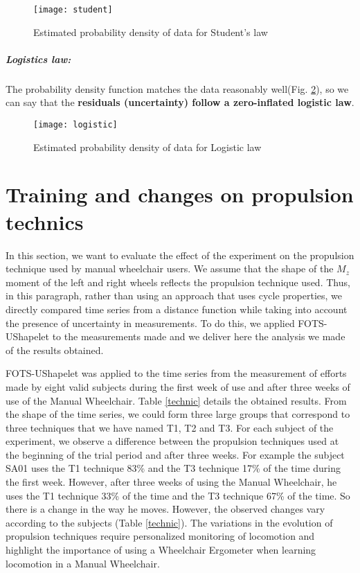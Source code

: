 \begin{figure}[h]
\centering
\texttt{[image: student]}
\caption{Estimated probability density of data for Student's law}
\label{student}
\end{figure}

\paragraph{Logistics law:} The probability density function matches the data reasonably well(Fig. \ref{logistic}), so we can say that the \textbf{residuals (uncertainty) follow a zero-inflated logistic law}.

\begin{figure}[h]
\centering
\texttt{[image: logistic]}
\caption{Estimated probability density of data for Logistic law}
\label{logistic}
\end{figure}









\chapter{Training and changes on propulsion technics}
\label{training_technic}
In this section, we want to evaluate the effect of the experiment on the propulsion technique used by manual wheelchair users. We assume that the shape of the $M_z$ moment of the left and right wheels reflects the propulsion technique used. Thus, in this paragraph, rather than using an approach that uses cycle properties, we  directly compared time series from a distance function while taking into account the presence of uncertainty in measurements. To do this, we applied FOTS-UShapelet to the measurements made and we deliver here the analysis we made of the results obtained.



FOTS-UShapelet was applied to the time series from the measurement of efforts made by eight valid subjects during the first week of use and after three weeks of use of the Manual Wheelchair. Table \ref{technic} details the obtained results. From the shape of the time series, we could form three large groups that correspond to three techniques that we have named T1, T2 and T3. For each subject of the experiment, we observe a difference between the propulsion techniques used at the beginning of the trial period and after three weeks. For example the subject SA01  uses the T1 technique 83\% and the T3 technique 17\% of the time during the first week. However, after three weeks of using the Manual Wheelchair, he uses the T1 technique 33\% of the time and the T3 technique 67\% of the time. So there is a change in the way he moves. 
However, the observed changes  vary according to the subjects (Table \ref{technic}). The variations in the evolution of propulsion techniques require personalized monitoring of locomotion and highlight the importance of using a Wheelchair Ergometer when learning locomotion in a Manual Wheelchair.




